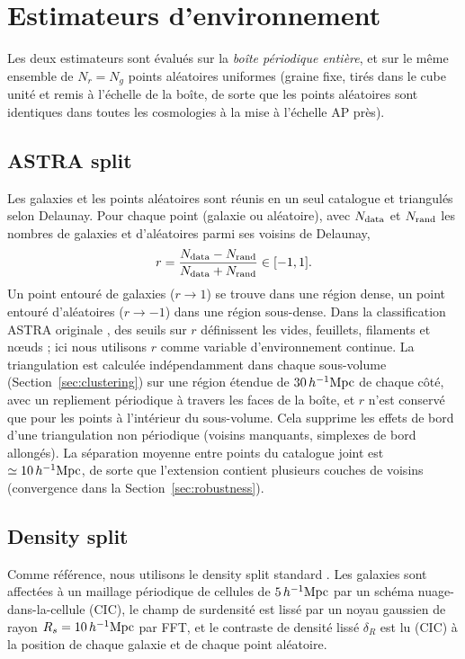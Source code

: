 \section{Estimateurs d'environnement}
\label{sec:env}

Les deux estimateurs sont évalués sur la \emph{boîte périodique entière}, et sur le même ensemble de $N_r = N_g$ points aléatoires uniformes (graine fixe, tirés dans le cube unité et remis à l'échelle de la boîte, de sorte que les points aléatoires sont identiques dans toutes les cosmologies à la mise à l'échelle AP près).

\subsection{ASTRA split}

Les galaxies et les points aléatoires sont réunis en un seul catalogue et triangulés selon Delaunay. Pour chaque point (galaxie ou aléatoire), avec $N_{\rm data}$ et $N_{\rm rand}$ les nombres de galaxies et d'aléatoires parmi ses voisins de Delaunay,
\begin{equation}
r = \frac{N_{\rm data}-N_{\rm rand}}{N_{\rm data}+N_{\rm rand}} \in [-1,1].
\label{eq:astra_r}
\end{equation}
Un point entouré de galaxies ($r\to1$) se trouve dans une région dense, un point entouré d'aléatoires ($r\to-1$) dans une région sous-dense. Dans la classification ASTRA originale \cite{ASTRA}, des seuils sur $r$ définissent les vides, feuillets, filaments et nœuds ; ici nous utilisons $r$ comme variable d'environnement continue. La triangulation est calculée indépendamment dans chaque sous-volume (Section~\ref{sec:clustering}) sur une région étendue de $30\,h^{-1}\mathrm{Mpc}$ de chaque côté, avec un repliement périodique à travers les faces de la boîte, et $r$ n'est conservé que pour les points à l'intérieur du sous-volume. Cela supprime les effets de bord d'une triangulation non périodique (voisins manquants, simplexes de bord allongés). La séparation moyenne entre points du catalogue joint est $\simeq10\,h^{-1}\mathrm{Mpc}$, de sorte que l'extension contient plusieurs couches de voisins (convergence dans la Section~\ref{sec:robustness}).

\subsection{Density split}

Comme référence, nous utilisons le density split standard \cite{Paillas2023}. Les galaxies sont affectées à un maillage périodique de cellules de $5\,h^{-1}\mathrm{Mpc}$ par un schéma nuage-dans-la-cellule (CIC), le champ de surdensité est lissé par un noyau gaussien de rayon $R_s=10\,h^{-1}\mathrm{Mpc}$ par FFT, et le contraste de densité lissé $\delta_R$ est lu (CIC) à la position de chaque galaxie et de chaque point aléatoire.

